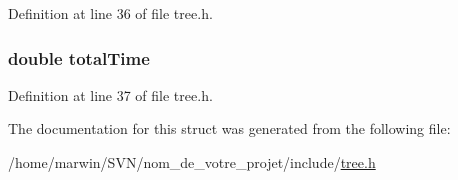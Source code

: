 Definition at line 36 of file tree.\-h.

\hypertarget{structdata_function_ae15a5fb5647ad685d2d5bde7fcfaa93a}{
\subsubsection[{total\-Time}]{\setlength{\rightskip}{0pt plus 5cm}double total\-Time}}\label{structdata_function_ae15a5fb5647ad685d2d5bde7fcfaa93a}


Definition at line 37 of file tree.\-h.



The documentation for this struct was generated from the following file\-:\begin{DoxyCompactItemize}
\item 
/home/marwin/\-S\-V\-N/nom\-\_\-de\-\_\-votre\-\_\-projet/include/\hyperlink{tree_8h}{tree.\-h}\end{DoxyCompactItemize}
